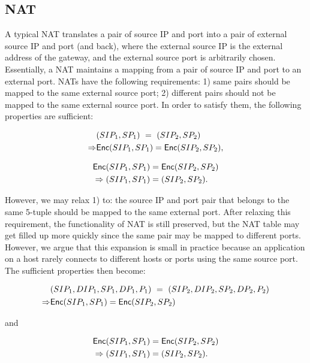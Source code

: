\subsection{NAT}
A typical NAT translates a pair of source IP and port into a pair of
external source IP and port (and back), where the external source IP is the external address of the gateway,
and the external source port is arbitrarily chosen. Essentially, a NAT maintains a mapping from a pair of source IP
and port to an external port. NATs have the following requirements: 
1) same pairs should be mapped to the same external source port; 
2) different pairs should not be mapped to the same external source port. 
In order to satisfy them, the following properties are sufficient:

\begin{equation}
\begin{split}
& (SIP_1, SP_1)\ =\ (SIP_2, SP_2) \\ 
 \Rightarrow & \mathsf{Enc}(SIP_1, SP_1) = \mathsf{Enc}(SIP_2, SP_2), 
\end{split}
\end{equation}



\begin{equation}
\begin{split}
& \mathsf{Enc}(SIP_1, SP_1) = \mathsf{Enc}(SIP_2, SP_2) \\
& \Rightarrow (SIP_1, SP_1) = (SIP_2, SP_2).
\end{split}
\end{equation}

However, we may relax 1) to: the source IP and port pair that belongs to the same 5-tuple 
should be mapped to the same external port.  After relaxing this requirement, the functionality of NAT is still preserved,
but the NAT table may get filled up more quickly since the same pair may be mapped to different ports. However,
we argue that this expansion is small in practice because an application on a host rarely connects to different hosts 
or ports using the same source port. The sufficient properties then become:

\begin{equation}
\label{eqn:nat1}
\begin{split}
& (SIP_1, DIP_1, SP_1, DP_1, P_1)\ =\ (SIP_2, DIP_2, SP_2, DP_2, P_2) \\
\Rightarrow & \mathsf{Enc}(SIP_1, SP_1) = \mathsf{Enc}(SIP_2, SP_2) \\
\end{split}
\end{equation}
\begin{center}
and
\end{center}
\begin{equation}
\label{eqn:nat2}
\begin{split}
& \mathsf{Enc}(SIP_1, SP_1) = \mathsf{Enc}(SIP_2, SP_2) \\
& \Rightarrow (SIP_1, SP_1) = (SIP_2, SP_2). 
\end{split}
\end{equation}

